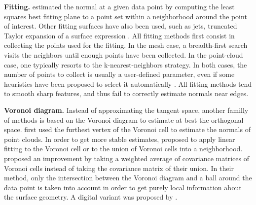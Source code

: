\noindent\textbf{Fitting.}
\citeauthor*{Hoppe1992} \cite{Hoppe1992} estimated the normal at a given data point by computing
the least squares best fitting plane to a point set within a neighborhood
around the point of interest.
Other fitting surfaces have also been used, such as jets, \ie truncated Taylor expansion
of a surface expression \cite{Cazals2005,Cazals2008}. 
All fitting methods first consist in collecting the points used for the fitting.
In the mesh case, a breadth-first search visits the neighbors until enough points
have been collected. In the point-cloud case, one typically resorts to the k-nearest-neighbors
strategy. In both cases, the number of points to collect is usually a user-defined parameter,
even if some heuristics have been proposed to select it automatically \cite{Hoppe1992,Cazals2005}.
All fitting methods tend to smooth sharp features, and thus fail to correctly estimate normals
near edges.  




\noindent\textbf{Voronoi diagram.}
Instead of approximating the tangent space, another familly of methods is based on the
Voronoi diagram to estimate at best the orthogonal space. \citeauthor*{Amenta1999} \cite{Amenta1999}
first used the furthest vertex of the Voronoi cell to estimate the normals of point clouds.
In order to get more stable estimates, \citeauthor*{Alliez2007} \cite{Alliez2007} proposed to apply linear fitting
to the Voronoi cell or to the union of Voronoi cells into a neighborhood. 
\citeauthor*{Merigot2011} \cite{Merigot2011} proposed an improvement %
by taking a weighted average of covariance matrices of Voronoi cells instead of
taking the covariance matrix of their union. In their method,
only the intersection between the Voronoi diagram and a ball around the data point
is taken into account in order to get purely local information about the surface geometry.
A digital variant was proposed by \citeauthor*{Cuel2015} \cite{Cuel2015}. 

